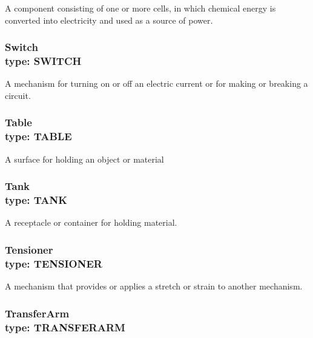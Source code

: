 A component consisting of one or more cells, in which chemical energy is converted into electricity and used as a source of power. 



\subsubsection[Switch]{Switch \\ {\small type: SWITCH}}
\label{sec:Switch}



A mechanism for turning on or off an electric current or for making or breaking a circuit.



\subsubsection[Table]{Table \\ {\small type: TABLE}}




A surface for holding an object or material



\subsubsection[Tank]{Tank \\ {\small type: TANK}}
\label{sec:Tank}



A receptacle or container for holding material.



\subsubsection[Tensioner]{Tensioner \\ {\small type: TENSIONER}}
\label{sec:Tensioner}



A mechanism that provides or applies a stretch or strain to another mechanism.



\subsubsection[TransferArm]{TransferArm \\ {\small type: TRANSFER\textunderscore ARM}}
\label{sec:TransferArm}




